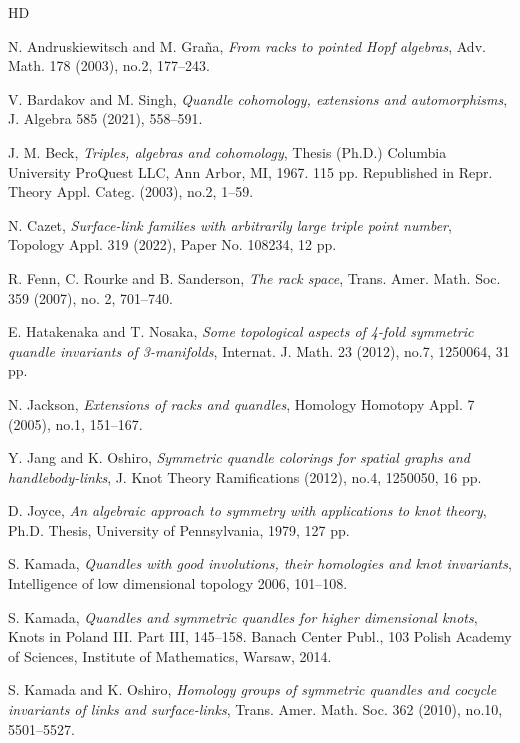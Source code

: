 \documentclass[11pt,reqno]{amsart}
\theoremstyle{definition}
\numberwithin{equation}{subsection}
\begin{document}
\begin{thebibliography}{HD}
	
	 N. Andruskiewitsch and M. Gra\~{n}a, \textit{From racks to pointed Hopf algebras}, Adv. Math. 178 (2003), no.2, 177--243.
	

 V.  Bardakov and M. Singh, \textit{Quandle cohomology, extensions and automorphisms}, J. Algebra 585 (2021), 558--591.

	 J. M. Beck, \textit{Triples, algebras and cohomology}, Thesis (Ph.D.) Columbia University ProQuest LLC, Ann Arbor, MI, 1967. 115 pp. Republished in Repr. Theory Appl. Categ. (2003), no.2, 1--59.
		
	 N. Cazet, \textit{Surface-link families with arbitrarily large triple point number}, Topology Appl. 319 (2022), Paper No. 108234, 12 pp.
		
		
	 R. Fenn, C. Rourke and B. Sanderson, \textit{The rack space}, Trans. Amer. Math. Soc. 359 (2007), no. 2, 701--740.
	
	 E. Hatakenaka and T. Nosaka, \textit{Some topological aspects of 4-fold symmetric quandle invariants of 3-manifolds}, Internat. J. Math. 23 (2012), no.7, 1250064, 31 pp.
	
	 N. Jackson, \textit{Extensions of racks and quandles}, Homology Homotopy Appl. 7 (2005), no.1, 151--167.
	
	 Y. Jang and K. Oshiro, \textit{Symmetric quandle colorings for spatial graphs and handlebody-links}, J. Knot Theory Ramifications (2012), no.4, 1250050, 16 pp.	
	
	 D. Joyce, \textit{An algebraic approach to symmetry with applications to knot theory}, Ph.D. Thesis, University of Pennsylvania, 1979, 127 pp.
	
	 S. Kamada, 	\textit{Quandles with good involutions, their homologies and knot invariants}, Intelligence of low dimensional topology 2006, 101--108.
	
	 S. Kamada,	\textit{Quandles and symmetric quandles for higher dimensional knots}, Knots in Poland III. Part III, 145--158.
	Banach Center Publ., 103 Polish Academy of Sciences, Institute of Mathematics, Warsaw, 2014.
	
	 S. Kamada and K. Oshiro, \textit{Homology groups of symmetric quandles and cocycle invariants of links and surface-links}, Trans. Amer. Math. Soc. 362 (2010), no.10, 5501--5527.
	    

\end{thebibliography}
\end{document}
